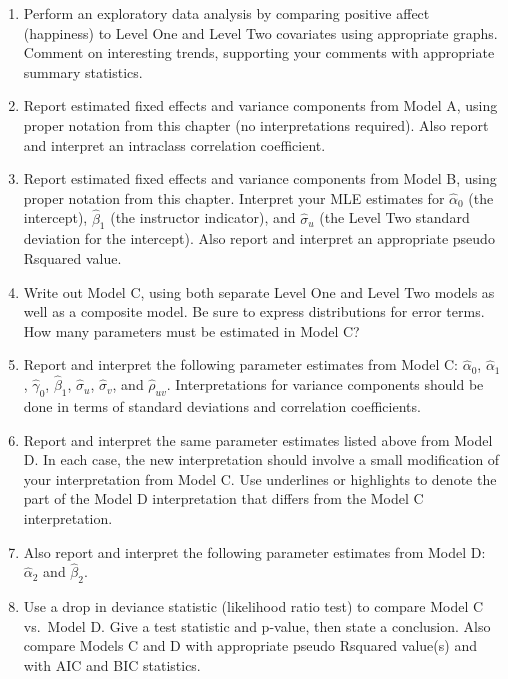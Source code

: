 \documentclass[
]{krantz}
\providecommand{\tightlist}{%
  \setlength{\itemsep}{0pt}\setlength{\parskip}{0pt}}
\begin{document}
\begin{enumerate}
  \begin{enumerate}
  \def\labelenumii{\arabic{enumii}.}
  \tightlist
  \item
    Perform an exploratory data analysis by comparing positive affect (happiness) to Level One and Level Two covariates using appropriate graphs. Comment on interesting trends, supporting your comments with appropriate summary statistics.
  \item
    Report estimated fixed effects and variance components from Model A, using proper notation from this chapter (no interpretations required). Also report and interpret an intraclass correlation coefficient.
  \item
    Report estimated fixed effects and variance components from Model B, using proper notation from this chapter. Interpret your MLE estimates for \(\hat{\alpha}_{0}\) (the intercept), \(\hat{\beta}_{1}\) (the instructor indicator), and \(\hat{\sigma}_{u}\) (the Level Two standard deviation for the intercept). Also report and interpret an appropriate pseudo Rsquared value.
  \item
    Write out Model C, using both separate Level One and Level Two models as well as a composite model. Be sure to express distributions for error terms. How many parameters must be estimated in Model C?
  \item
    Report and interpret the following parameter estimates from Model C: \(\hat{\alpha}_{0}\), \(\hat{\alpha}_{1}\), \(\hat{\gamma}_{0}\), \(\hat{\beta}_{1}\), \(\hat{\sigma}_{u}\), \(\hat{\sigma}_{v}\), and \(\hat{\rho}_{uv}\). Interpretations for variance components should be done in terms of standard deviations and correlation coefficients.
  \item
    Report and interpret the same parameter estimates listed above from Model D. In each case, the new interpretation should involve a small modification of your interpretation from Model C. Use underlines or highlights to denote the part of the Model D interpretation that differs from the Model C interpretation.
  \item
    Also report and interpret the following parameter estimates from Model D: \(\hat{\alpha}_{2}\) and \(\hat{\beta}_{2}\).
  \item
    Use a drop in deviance statistic (likelihood ratio test) to compare Model C vs.~Model D. Give a test statistic and p-value, then state a conclusion. Also compare Models C and D with appropriate pseudo Rsquared value(s) and with AIC and BIC statistics.
  \end{enumerate}
\end{enumerate}
\end{document}
